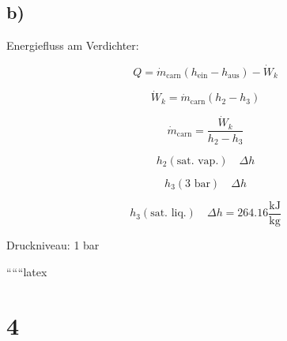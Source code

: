 

\subsection*{b)}

Energiefluss am Verdichter:

\[
Q = \dot{m}_{\text{carn}} (h_{\text{ein}} - h_{\text{aus}}) - \dot{W}_k
\]

\[
\dot{W}_k = \dot{m}_{\text{carn}} (h_2 - h_3)
\]

\[
\dot{m}_{\text{carn}} = \frac{\dot{W}_k}{h_2 - h_3}
\]

\[
h_2 (\text{sat. vap.}) \quad \Delta h
\]

\[
h_3 (\text{3 bar}) \quad \Delta h
\]

\[
h_3 (\text{sat. liq.}) \quad \Delta h = 264.16 \frac{\text{kJ}}{\text{kg}}
\]

Druckniveau: 1 bar

``````latex


\section*{4}